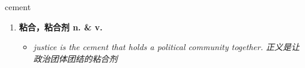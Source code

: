 
\begin{frame}
{\huge cement}
\begin{center}
\begin{enumerate}\Large
  \item \textbf{粘合，粘合剂 n. \& v.}
  \begin{itemize}
    \item \em{\Large{justice is the cement that holds a political community together. 正义是让政治团体团结的粘合剂}}
  \end{itemize}
\end{enumerate}
\end{center}
\end{frame}
